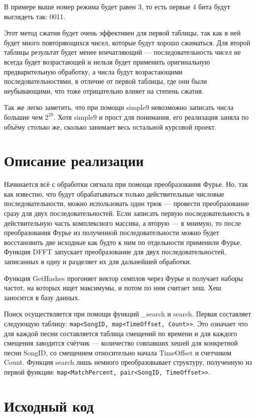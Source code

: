 \documentclass[12pt]{article}
\newcommand{\se}[1]{\section*{\bf #1}}
\newcommand{\lst}[2]{
	\subsection*{\textbf{#2}}
	{\footnotesize
	
	}
}
\begin{document}
В примере выше номер режима будет равен 3, то есть первые 4 бита будут выглядеть так: 0011.

Этот метод сжатия будет очень эффективен для первой таблицы, так как в ней будет много
повторяющихся чисел, которые будут хорошо сжиматься. Для второй таблицы результат будет менее
впечатляющий --- последовательность чисел не всегда будет возрастающей и нельзя
будет применить оригинальную предварительную обработку, а числа будут возрастающими
последовательностями, в отличие от первой таблицы, где они были неубывающими, что тоже отрицательно влияет на степень сжатия.


Так же легко заметить, что при помощи simple9 невозможно записать числа большие чем $2^{28}$.
Хотя simple9 и прост для понимания, его реализация заняла по объёму столько же, сколько занимает
весь остальной курсовой проект.

\se{Описание реализации}

Начинается всё с обработки сигнала при помощи преобразования Фурье. Но, так как известно, что будут обрабатываться только действительные числовые
последовательности, можно использовать один трюк --- провести преобразование сразу для
двух последовательностей. Если записать первую последовательность в действительную часть
комплексного массива, а вторую --- в мнимую, то после преобразования Фурье из полученной
последовательности можно будет восстановить две исходные как будто к ним по отдельности
применили Фурье.  Функция DFFT запускает преобразование для двух последовательностей,
записанных в одну и разделяет их для дальнейшей обработки.

Функция GetHashes прогоняет вектор семплов через Фурье и получает наборы частот, на которых
ищет максимумы, и потом по ним считает хеш. Хеш заносится в базу данных.

Поиск осуществляется при помощи функций \_search и search. Первая составляет следующую
таблицу: \lstinline{map<SongID, map<TimeOffset, Count>>}. Это означает что для каждой
песни составляется таблица смещений по времени и для каждого смещения заводится счётчик
--- количество совпавших хешей для конкретной песни SongID, со смещением относительно начала
TimeOffset и счетчиком Count. Функция search лишь немного преобразовывает структуру,
полученную из первой функции: \lstinline{map<MatchPercent, pair<SongID, TimeOffset>>}.

\se{Исходный код}

\newpage
\end{document}
